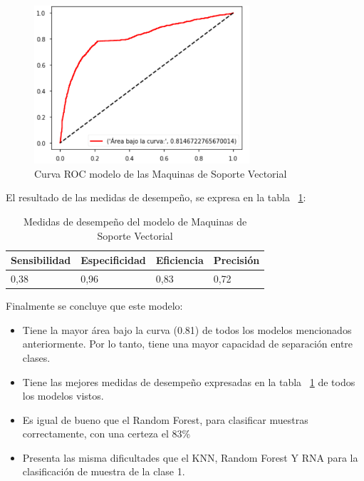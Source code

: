 \documentclass[conference]{IEEEtran}
\begin{document}
\begin{center}
    \begin{figure}[h]
        \hfill
     \centerline{\includegraphics[width=8cm]{ROCSVM.png}}
    \caption{Curva ROC modelo de las Maquinas de Soporte Vectorial}
    \label{fig:rocSVM}
    \end{figure}  
\end{center}
El resultado de las medidas de desempeño, se expresa en la tabla ~\ref{tab:medidasRNA}: 
\newline
\begin{table}[h]
\centering
\begin{tabular}{|l|l|l|l|}
\hline
Sensibilidad & Especificidad & \multicolumn{1}{r|}{Eficiencia} & Precisión \\ \hline
0,38         & 0,96          & 0,83                            & 0,72      \\ \hline
\end{tabular}
\caption{Medidas de desempeño del modelo de Maquinas de Soporte Vectorial}
\label{tab:medidasRNA}
\end{table}

Finalmente se concluye que este modelo:
\begin{itemize}
\item Tiene la mayor área bajo la curva (0.81) de todos los modelos mencionados anteriormente. Por lo tanto, tiene una mayor capacidad de separación entre clases.
\item Tiene las mejores medidas de desempeño expresadas en la tabla ~\ref{tab:medidasRNA} de todos los modelos vistos.
\item Es igual de bueno que el Random Forest, para clasificar muestras correctamente, con una certeza el 83\%
\item Presenta las misma dificultades que el KNN, Random Forest Y RNA para la clasificación de muestra de la clase 1.
\end{itemize}
\end{document}
